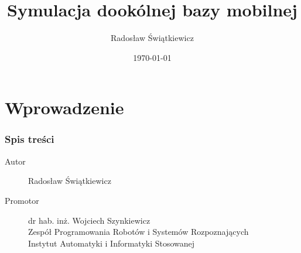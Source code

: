 \documentclass{beamer}
\begin{document}
	\section{Wprowadzenie}
	\begin{frame}
		\title[Omnivelma]{Symulacja dookólnej bazy mobilnej}
		\author{Radosław Świątkiewicz}
		\date{\today}
		\titlepage
	\end{frame}
	\begin{frame}
		\frametitle{Spis treści}
		\tableofcontents[currentsection]
	\end{frame}
	\begin{frame}
		\begin{description}
			\item[Autor] Radosław Świątkiewicz
			\item[Promotor] dr hab. inż. Wojciech Szynkiewicz \\ Zespół Programowania Robotów i Systemów Rozpoznających \\ Instytut Automatyki i Informatyki Stosowanej
		\end{description}
	\end{frame}
	
\end{document}
